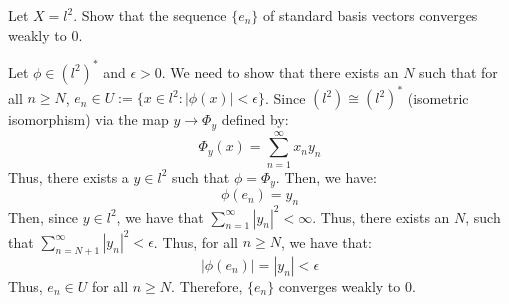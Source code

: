 \documentclass[12pt]{article}
\begin{document}
\begin{problem}{60}
    Let $X = l^2$. Show that the sequence $\{e_n\}$ of standard basis vectors converges weakly to $0$. 
\end{problem}
\begin{solution}
    Let $\phi \in (l^2)^*$ and $\epsilon > 0$. We need to show that there exists an $N$ such that for all $n \geq N$, $e_n \in U := \{x \in l^2: |\phi(x)| < \epsilon\}$. Since $(l^2) \cong (l^2)^*$ (isometric isomorphism) via the map $y \to \Phi_y$ defined by: 
    \[ \Phi_y(x) = \sum_{n=1}^\infty x_ny_n\]
    Thus, there exists a $y \in l^2$ such that $\phi = \Phi_y$. Then, we have:
    \[ \phi(e_n) = y_n \]
    Then, since $y \in l^2$, we have that $\sum_{n=1}^\infty |y_n|^2 < \infty$. Thus, there exists an $N$, such that $\sum_{n=N+1}^\infty |y_n|^2 < \epsilon$. Thus, for all $n \geq N$, we have that: 
    \[ |\phi(e_n)| = |y_n| < \epsilon\]
    Thus, $e_n \in U$ for all $n \geq N$. Therefore, $\{e_n\}$ converges weakly to $0$. \bbni
\end{solution}
\newpage
\end{document}

